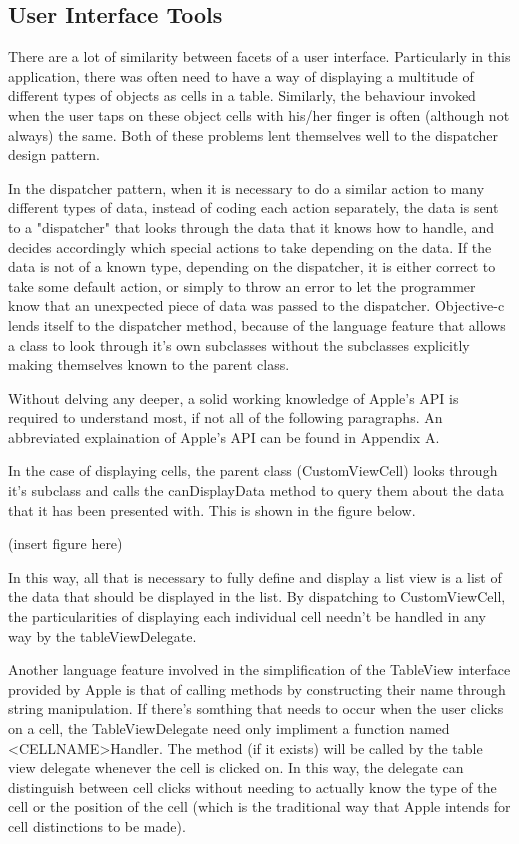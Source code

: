 \documentclass[se]{uw-wkrpt}
\begin{document}
\subsection{User Interface Tools}

There are a lot of similarity between facets of a user interface. Particularly in this
application, there was often need to have a way of displaying a multitude of different
types of objects as cells in a table. Similarly, the behaviour invoked when the user
taps on these object cells with his/her finger is often (although not always) the same.
Both of these problems lent themselves well to the dispatcher design pattern. 

In the dispatcher pattern,
when it is necessary to do a similar action to many different types of data, instead of coding
each action separately, the data is sent to a "dispatcher" that looks through the data that
it knows how to handle, and decides accordingly which special actions to take depending on
the data. If the data is not of a known type, depending on the dispatcher, it is either correct
to take some default action, or simply to throw an error to let the programmer know that 
an unexpected piece of data was passed to the dispatcher. Objective-c lends itself to the 
dispatcher method, because of the language feature that allows a class to look through it's
own subclasses without the subclasses explicitly making themselves known to the parent class.

Without delving any deeper, a solid working knowledge of Apple's API is required to understand
most, if not all of the following paragraphs. An abbreviated explaination of Apple's API can 
be found in Appendix A.

In the case of displaying cells, the parent class (CustomViewCell) looks through it's subclass
and calls the canDisplayData method to query them about the data that it has been presented with.
This is shown in the figure below.

(insert figure here)

In this way, all that is necessary to fully define and display a list view is a list of the data
that should be displayed in the list. By dispatching to CustomViewCell, the particularities of
displaying each individual cell needn't be handled in any way by the tableViewDelegate. 

Another language feature involved in the simplification of the TableView interface provided
by Apple is that of calling methods by constructing their name through string manipulation.
If there's somthing that needs to occur when the user clicks on a cell, the TableViewDelegate
need only impliment a function named <CELLNAME>Handler. The method (if it exists) will be called
by the table view delegate whenever the cell is clicked on. In this way, the delegate can 
distinguish between cell clicks without needing to actually know the type of the cell or the
position of the cell (which is the traditional way that Apple intends for cell distinctions to
be made). 
\end{document}
